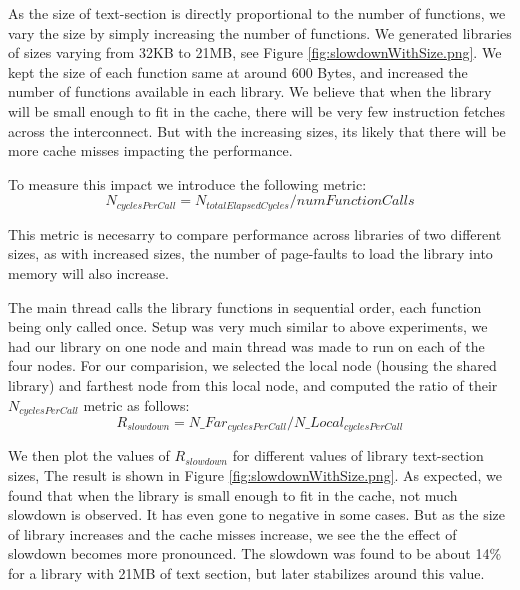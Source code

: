 As the size of text-section is directly proportional to the number of functions, we vary the size by simply 
increasing the number of functions. We generated libraries of sizes varying from 32KB to 21MB, see Figure \ref{fig:slowdownWithSize.png}.
We kept the size of each function same at around 600 Bytes, and increased the number of functions available in each library.
We believe that when the library will be small enough to fit in the cache, there will be very few instruction fetches across the interconnect.
But with the increasing sizes, its likely that there will be more cache misses impacting the performance.

To measure this impact we introduce the following metric:
\begin{dmath}
\label{eqn:cyclesPerCall}
N_{cyclesPerCall} =  N_{totalElapsedCycles} / numFunctionCalls
\end{dmath}

This metric is necesarry to compare performance across libraries of two different sizes, as with increased sizes, the number
of page-faults to load the library into memory will also increase.

The main thread calls the library functions in sequential order, each function being only called once.
Setup was very much similar to above experiments, we had our library on one node and main thread was made to run on 
each of the four nodes. For our comparision, we selected the local node (housing the shared library) and farthest node
from this local node, and computed the ratio of their $N_{cyclesPerCall}$ metric as follows:
\begin{dmath}
\label{eqn:slowdown}
R_{slowdown} =  N\_Far_{cyclesPerCall} / N\_Local_{cyclesPerCall}
\end{dmath}

We then plot the values of $R_{slowdown}$ for different values of library text-section sizes,
The result is shown in Figure \ref{fig:slowdownWithSize.png}.
As expected, we found that when the library is small enough to fit in the cache, not much slowdown is observed.
It has even gone to negative in some cases. But as the size of library increases and the cache misses increase,
we see the the effect of slowdown becomes more pronounced. The slowdown was found to be about 14\% for a library
with 21MB of text section, but later stabilizes around this value.

